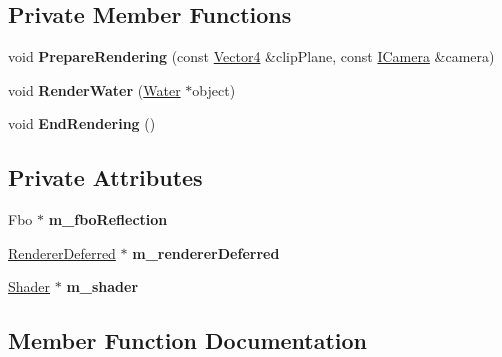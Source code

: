 \subsection*{Private Member Functions}
\begin{DoxyCompactItemize}
\item 
\mbox{\label{class_flounder_1_1_renderer_waters_ac0c542dd1dc9a284a2e1e1ec5cd8b1f4}} 
void {\bfseries Prepare\+Rendering} (const \hyperlink{class_flounder_1_1_vector4}{Vector4} \&clip\+Plane, const \hyperlink{class_flounder_1_1_i_camera}{I\+Camera} \&camera)
\item 
\mbox{\label{class_flounder_1_1_renderer_waters_a8406b6273c1f2542506549a2bc9ae84b}} 
void {\bfseries Render\+Water} (\hyperlink{class_flounder_1_1_water}{Water} $\ast$object)
\item 
\mbox{\label{class_flounder_1_1_renderer_waters_acbc9a61a2511e0160fcfb2372094dd24}} 
void {\bfseries End\+Rendering} ()
\end{DoxyCompactItemize}
\subsection*{Private Attributes}
\begin{DoxyCompactItemize}
\item 
\mbox{\label{class_flounder_1_1_renderer_waters_ada8fcf52270726caf4abea33fd795e5d}} 
Fbo $\ast$ {\bfseries m\+\_\+fbo\+Reflection}
\item 
\mbox{\label{class_flounder_1_1_renderer_waters_abde95407f0108552ce244e30459dd20f}} 
\hyperlink{class_flounder_1_1_renderer_deferred}{Renderer\+Deferred} $\ast$ {\bfseries m\+\_\+renderer\+Deferred}
\item 
\mbox{\label{class_flounder_1_1_renderer_waters_a5dd15db174223133ad19668c79a9dcba}} 
\hyperlink{class_flounder_1_1_shader}{Shader} $\ast$ {\bfseries m\+\_\+shader}
\end{DoxyCompactItemize}


\subsection{Member Function Documentation}
\mbox{\label{class_flounder_1_1_renderer_waters_ac48fe095f41d641fb51a26abe4b1ed6a}} 
